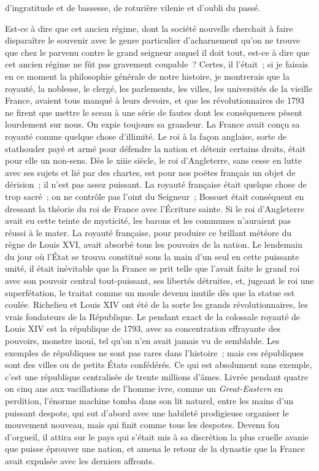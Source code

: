 \documentclass[french,twoside]{book} %
\begin{document}
d’ingratitude et de bassesse, de roturière vilenie et d’oubli du passé.\par
Est-ce à dire que cet ancien régime, dont la société nouvelle cherchait à faire disparaître le souvenir avec le genre particulier d’acharnement qu’on ne trouve que chez le parvenu contre le grand seigneur auquel il doit tout, est-ce à dire que cet ancien régime ne fût pas gravement coupable ? Certes, il l’était ; si je faisais en ce moment la philosophie générale de notre histoire, je montrerais que la royauté, la noblesse, le clergé, les parlements, les villes, les universités de la vieille France, avaient tous manqué à leurs devoirs, et que les révolutionnaires de 1793 ne firent que mettre le sceau à une série de fautes dont les conséquences pèsent lourdement sur nous. On expie toujours sa grandeur. La France avait conçu sa royauté comme quelque chose d’illimité. Le roi à la façon anglaise, sorte de stathouder payé et armé pour défendre la nation et détenir certains droits, était pour elle un non-sens. Dès le xiiie siècle, le roi d’Angleterre, sans cesse en lutte avec ses sujets et lié par des chartes, est pour nos poëtes français un objet de dérision ; il n’est pas assez puissant. La royauté française était quelque chose de trop sacré ; on ne contrôle pas l’oint du Seigneur ; Bossuet était conséquent en dressant la théorie du roi de France avec l’Écriture sainte. Si le roi d’Angleterre avait eu cette teinte de mysticité, les barons et les communes n’auraient pas réussi à le mater. La royauté française, pour produire ce brillant météore du règne de Louis XVI, avait absorbé tous les pouvoirs de la nation. Le lendemain du jour où l’État se trouva constitué sous la main d’un seul en cette puissante unité, il était inévitable que la France se prit telle que l’avait faite le grand roi avec son pouvoir central tout-puissant, ses libertés détruites, et, jugeant le roi une superfétation, le traitat comme un moule devenu inutile dès que la statue est coulée. Richelieu et Louis XIV ont été de la sorte les grands révolutionnaires, les vrais fondateurs de la République. Le pendant exact de la colossale royauté de Louis XIV est la république de 1793, avec sa concentration effrayante des pouvoirs, monstre inouï, tel qu’on n’en avait jamais vu de semblable. Les exemples de républiques ne sont pas rares dans l’histoire ; mais ces républiques sont des villes ou de petits États confédérés. Ce qui est absolument sans exemple, c’est une république centralisée de trente millions d’âmes. Livrée pendant quatre on cinq ans aux vacillations de l’homme ivre, comme un {\itshape Great-Eastern} en perdition, l’énorme machine tomba dans son lit naturel, entre les mains d’un puissant despote, qui sut d’abord avec une habileté prodigieuse organiser le mouvement nouveau, mais qui finit comme tous les despotes. Devenu fou d’orgueil, il attira sur le pays qui s’était mis à sa discrétion la plus cruelle avanie que puisse éprouver une nation, et amena le retour de la dynastie que la France avait expulsée avec les derniers affronts.
\end{document}
